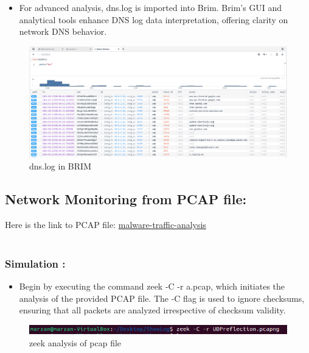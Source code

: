 \begin{itemize}
    \item For advanced analysis, dns.log is imported into Brim. Brim's GUI and analytical tools enhance DNS log data interpretation, offering clarity on network DNS behavior.
\end{itemize}

\begin{figure}[H]
    \centering
    \includegraphics[width=1\linewidth]{images/live_monitor/live_brim_dns.png}
    \caption{dns.log in BRIM}
    \label{fig:enter-label}
\end{figure}



\subsection{Network Monitoring from PCAP file:}

Here is the link to PCAP file:
\href{https://www.malware-traffic-analysis.net/tutorials/index.html}{malware-traffic-analysis}\\\\

\subsubsection{Simulation :}
\begin{itemize}
    \item Begin by executing the command zeek -C -r a.pcap, which initiates the analysis of the provided PCAP file. The -C flag is used to ignore checksums, ensuring that all packets are analyzed irrespective of checksum validity.
\end{itemize}

\begin{figure}[H]
    \centering
    \includegraphics[width=1\linewidth]{images/pcap/pcap_1.png}
    \caption{zeek analysis of pcap file }
    \label{fig:enter-label}
\end{figure}

